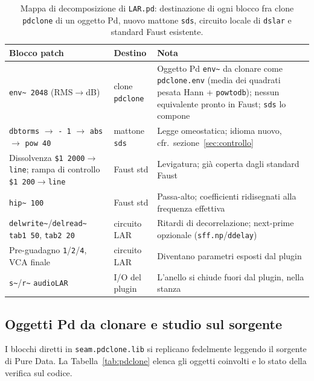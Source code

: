 \documentclass[11pt,a4paper]{article}
\begin{document}
\begin{table}[htbp]
\centering
\small
\begin{tabular}{@{}>{\raggedright\arraybackslash}p{4.6cm}>{\raggedright\arraybackslash}p{2.4cm}>{\raggedright\arraybackslash}p{7.1cm}@{}}
\toprule
Blocco patch & Destino & Nota \\
\midrule
\texttt{env\textasciitilde{} 2048} (RMS$\to$dB) & clone \texttt{pdclone} & Oggetto Pd \texttt{env\textasciitilde{}} da clonare come \texttt{pdclone.env} (media dei quadrati pesata Hann + \texttt{powtodb}); nessun equivalente pronto in Faust; \texttt{sds} lo compone \\[4pt]
\texttt{dbtorms} $\to$ \texttt{- 1} $\to$ \texttt{abs} $\to$ \texttt{pow 40} & mattone \texttt{sds} & Legge omeostatica; idioma nuovo, cfr.~sezione~\ref{sec:controllo} \\[4pt]
Dissolvenza \texttt{\$1 2000}$\to$\texttt{line}; rampa di controllo \texttt{\$1 200}$\to$\texttt{line} & Faust std & Levigatura; già coperta dagli standard Faust \\[4pt]
\texttt{hip\textasciitilde{} 100} & Faust std & Passa-alto; coefficienti ridisegnati alla frequenza effettiva \\[4pt]
\texttt{delwrite\textasciitilde{}}/\texttt{delread\textasciitilde{}} \texttt{tab1 50}, \texttt{tab2 20} & circuito LAR & Ritardi di decorrelazione; next-prime opzionale (\texttt{sff.np}/\texttt{ddelay}) \\[4pt]
Pre-guadagno \texttt{1}/\texttt{2}/\texttt{4}, VCA finale & circuito LAR & Diventano parametri esposti dal plugin \\[4pt]
\texttt{s\textasciitilde{}}/\texttt{r\textasciitilde{}} \texttt{audioLAR} & I/O del plugin & L'anello si chiude fuori dal plugin, nella stanza \\
\bottomrule
\end{tabular}
\caption{Mappa di decomposizione di \texttt{LAR.pd}: destinazione di ogni blocco fra clone \texttt{pdclone} di un oggetto Pd, nuovo mattone \texttt{sds}, circuito locale di \texttt{dslar} e standard Faust esistente.}
\label{tab:decomposizione}
\end{table}

\subsection{Oggetti Pd da clonare e studio sul sorgente}
I blocchi diretti in \texttt{seam.pdclone.lib} si replicano fedelmente leggendo il sorgente di Pure Data.
La Tabella~\ref{tab:pdclone} elenca gli oggetti coinvolti e lo stato della verifica sul codice.
\end{document}
